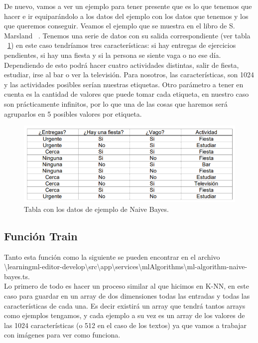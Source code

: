 \documentclass[a4paper, 12pt]{book}
\begin{document}
De nuevo, vamos a ver un ejemplo para tener presente que es lo que tenemos que hacer e ir equiparándolo a los datos del ejemplo con los datos que tenemos y los que queremos conseguir. Veamos el ejemplo que se muestra en el libro de S. Marsland ~\cite{machinelearning}. Tenemos una serie de datos con su salida correspondiente (ver tabla ~\ref{fig:tablabayes}) en este caso tendríamos tres características: si hay entregas de ejercicios pendientes, si hay una fiesta y si la persona se siente vaga o no ese día. Dependiendo de esto podrá hacer cuatro actividades distintas, salir de fiesta, estudiar, irse al bar o ver la televisión. 
Para nosotros, las características, son 1024 y las actividades posibles serían nuestras etiquetas. Otro parámetro a tener en cuenta es la cantidad de valores que puede tomar cada etiqueta, en nuestro caso son prácticamente infinitos, por lo que una de las cosas que haremos será agruparlos en 5 posibles valores por etiqueta. 

\begin{figure}
	\centering
	\includegraphics[width=12cm, keepaspectratio]{img/tablabayes}
	\caption{Tabla con los datos de ejemplo de Naive Bayes.}			
	\label{fig:tablabayes}
\end{figure}



\subsection{Función Train} 
\label{sec:funciontrainbayes}

Tanto esta función como la siguiente se pueden encontrar en el archivo \textbackslash learningml-editor-develop\textbackslash src\textbackslash app\textbackslash services\textbackslash mlAlgorithms\textbackslash ml-algorithm-naive-bayes.ts.\\
Lo primero de todo es hacer un proceso similar al que hicimos en K-NN, en este caso para guardar en un array de dos dimensiones todas las entradas y todas las características de cada una. Es decir existirá un array que tendrá tantos arrays como ejemplos tengamos, y cada ejemplo a su vez es un array de los valores de las 1024 características (o 512 en el caso de los textos) ya que vamos a trabajar con imágenes para ver como funciona.
\end{document}
